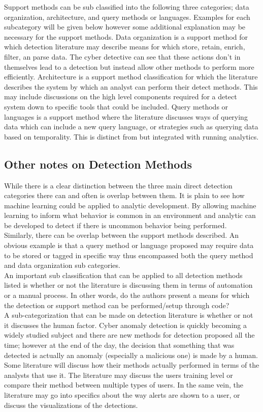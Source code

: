 \documentclass[10pt]{IEEEtran}
\begin{document}
Support methods can be sub classified into the following three categories; data organization, architecture, and query methods or languages. Examples for each subcategory will be given below however some additional explanation may be necessary for the support methods. Data organization is a support method for which detection literature may describe means for which store, retain, enrich, filter, an parse data. The cyber detective can see that these actions don't in themselves lead to a detection but instead allow other methods to perform more efficiently. Architecture is a support method classification for which the literature describes the system by which an analyst can perform their detect methods. This may include discussions on the high level components required for a detect system down to specific tools that could be included. Query methods or languages is a support method where the literature discusses ways of querying data which can include a new query language, or strategies such as querying data based on temporality. This is distinct from but integrated with running analytics.

\subsection{Other notes on Detection Methods}
While there is a clear distinction between the three main direct detection categories there can and often is overlap between them. It is plain to see how machine learning could be applied to analytic development. By allowing machine learning to inform what behavior is common in an environment and analytic can be developed to detect if there is uncommon behavior being performed.\\
Similarly, there can be overlap between the support methods described. An obvious example is that a query method or language proposed may require data to be stored or tagged in specific way thus encompassed both the query method and data organization sub categories.\\
An important sub classification that can be applied to all detection methods listed is whether or not the literature is discussing them in terms of automation or a manual process. In other words, do the authors present a means for which the detection or support method can be performed/setup through code?\\
A sub-categorization that can be made on detection literature is whether or not it discusses the human factor. Cyber anomaly detection is quickly becoming a widely studied subject and there are new methods for detection proposed all the time; however at the end of the day, the decision that something that was detected is actually an anomaly (especially a malicious one) is made by a human. Some literature will discuss how their methods actually performed in terms of the analysts that use it. The literature may discuss the users training level or compare their method between multiple types of users. In the same vein, the literature may go into specifics about the way alerts are shown to a user, or discuss the visualizations of the detections.
\end{document}
